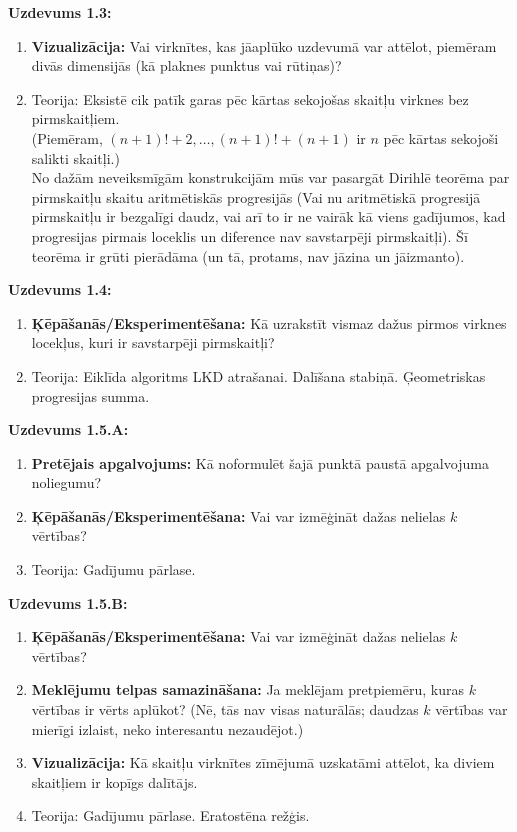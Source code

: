 \documentclass[a4paper,12pt]{article}
\begin{document}
{{\bf Uzdevums 1.3:} 
\begin{enumerate}
\item {\bf Vizualizācija:} Vai virknītes, kas jāaplūko uzdevumā var attēlot, piemēram divās dimensijās (kā plaknes punktus vai rūtiņas)?
\item Teorija: Eksistē cik patīk garas pēc kārtas sekojošas skaitļu virknes bez pirmskaitļiem.\\
(Piemēram, $(n+1)!+2,\ldots,(n+1)!+(n+1)$ ir 
$n$ pēc kārtas sekojoši salikti skaitļi.)\\
No dažām neveiksmīgām konstrukcijām mūs var pasargāt Dirihlē teorēma par pirmskaitļu skaitu arit\-mē\-tis\-kās progresijās (Vai nu 
aritmētiskā progresijā pirmskaitļu ir bezgalīgi daudz, vai arī to ir ne vairāk kā viens \textendash{} 
gadījumos, kad progresijas pirmais loceklis un diference nav savstarpēji pirmskaitļi).
Šī teorēma ir grūti pierādāma (un tā, protams, nav jāzina un jāizmanto).
\end{enumerate}


{\bf Uzdevums 1.4:} 
\begin{enumerate}
\item {\bf Ķēpāšanās/Eksperimentēšana:} Kā uzrakstīt vismaz dažus pirmos virknes locekļus, kuri ir savstarpēji pirmskaitļi? 
\item Teorija: Eiklīda algoritms LKD atrašanai.
Dalīšana stabiņā.
Ģeometriskas progresijas summa.
\end{enumerate}


{\bf Uzdevums 1.5.A:} 
\begin{enumerate}
\item {\bf Pretējais apgalvojums:} Kā noformulēt šajā punktā paustā apgalvojuma noliegumu?
\item {\bf Ķēpāšanās/Eksperimentēšana:} Vai var izmēģināt dažas nelielas $k$ vērtības? 
\item Teorija: Gadījumu pārlase.
\end{enumerate}


{\bf Uzdevums 1.5.B:} 
\begin{enumerate}
\item {\bf Ķēpāšanās/Eksperimentēšana:} Vai var izmēģināt dažas nelielas $k$ vērtības?
\item {\bf Meklējumu telpas samazināšana:} Ja meklējam pretpiemēru, kuras $k$ vērtības ir vērts aplūkot? (Nē, tās nav visas naturālās; 
daudzas $k$ vērtības var mierīgi izlaist, neko interesantu nezaudējot.)
\item {\bf Vizualizācija:} Kā skaitļu virknītes zīmējumā uzskatāmi attēlot, ka diviem skaitļiem ir kopīgs dalītājs.
\item Teorija: Gadījumu pārlase.
Eratostēna režģis.
\end{enumerate}

}
\end{document}
